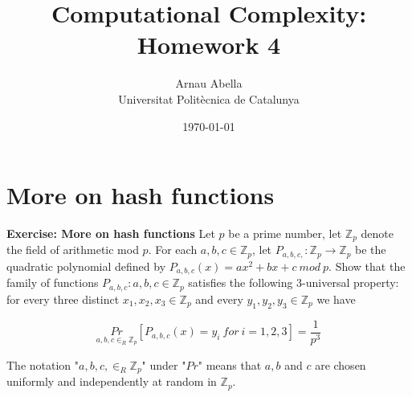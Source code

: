 \documentclass[12pt, a4paper]{article} %
\title{%
  Computational Complexity: Homework 4
}
\author{%
  Arnau Abella \\
  \large{Universitat Polit\`ecnica de Catalunya}
}
\date{\today}
\theoremstyle{definition}
\newcommand{\Z}{\mathbb{Z}}
\begin{document}
\maketitle


\section{More on hash functions}

\textbf{Exercise: More on hash functions} \quad Let $p$ be a prime number, let $\Z_p$ denote the field of arithmetic mod $p$. For each $a,b,c \in \Z_p$, let ${P_{a,b,c,} : \Z_p \to \Z_p}$ be the quadratic polynomial defined by $P_{a,b,c}(x) = ax^2 + bx + c \ mod \ p$. Show that the family of functions ${ P_{a,b,c}: a,b,c \in \Z_p}$ satisfies the following 3-universal property: for every three distinct $x_1, x_2, x_3 \in \Z_p$ and every $y_1, y_2, y_3 \in \Z_p$ we have

\begin{equation}\label{eq:one}
  \underset{a,b,c \in_R \Z_p}{Pr} [ P_{a,b,c}(x) = y_i \ for \ i = 1,2,3] = \frac{1}{p^3}
\end{equation}

The notation "$a,b,c, \in_R \Z_p$" under "$Pr$" means that $a,b$ and $c$ are chosen uniformly and independently at random in $\Z_p$.
\end{document}
